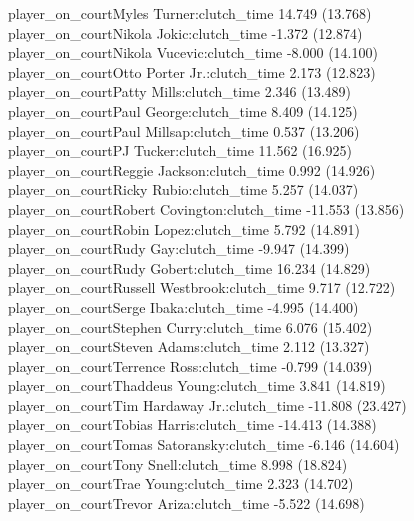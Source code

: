\documentclass[
  landscape]{article}
\begin{document}
player\_on\_courtMyles Turner:clutch\_time 14.749 (13.768)\\
player\_on\_courtNikola Jokic:clutch\_time -1.372 (12.874)\\
player\_on\_courtNikola Vucevic:clutch\_time -8.000 (14.100)\\
player\_on\_courtOtto Porter Jr.:clutch\_time 2.173 (12.823)\\
player\_on\_courtPatty Mills:clutch\_time 2.346 (13.489)\\
player\_on\_courtPaul George:clutch\_time 8.409 (14.125)\\
player\_on\_courtPaul Millsap:clutch\_time 0.537 (13.206)\\
player\_on\_courtPJ Tucker:clutch\_time 11.562 (16.925)\\
player\_on\_courtReggie Jackson:clutch\_time 0.992 (14.926)\\
player\_on\_courtRicky Rubio:clutch\_time 5.257 (14.037)\\
player\_on\_courtRobert Covington:clutch\_time -11.553 (13.856)\\
player\_on\_courtRobin Lopez:clutch\_time 5.792 (14.891)\\
player\_on\_courtRudy Gay:clutch\_time -9.947 (14.399)\\
player\_on\_courtRudy Gobert:clutch\_time 16.234 (14.829)\\
player\_on\_courtRussell Westbrook:clutch\_time 9.717 (12.722)\\
player\_on\_courtSerge Ibaka:clutch\_time -4.995 (14.400)\\
player\_on\_courtStephen Curry:clutch\_time 6.076 (15.402)\\
player\_on\_courtSteven Adams:clutch\_time 2.112 (13.327)\\
player\_on\_courtTerrence Ross:clutch\_time -0.799 (14.039)\\
player\_on\_courtThaddeus Young:clutch\_time 3.841 (14.819)\\
player\_on\_courtTim Hardaway Jr.:clutch\_time -11.808 (23.427)\\
player\_on\_courtTobias Harris:clutch\_time -14.413 (14.388)\\
player\_on\_courtTomas Satoransky:clutch\_time -6.146 (14.604)\\
player\_on\_courtTony Snell:clutch\_time 8.998 (18.824)\\
player\_on\_courtTrae Young:clutch\_time 2.323 (14.702)\\
player\_on\_courtTrevor Ariza:clutch\_time -5.522 (14.698)\\
\end{document}
